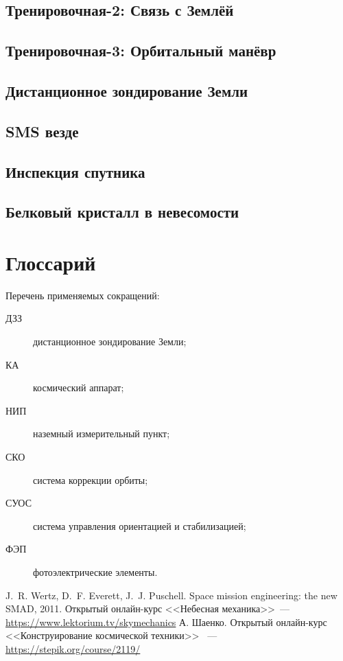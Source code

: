 \documentclass[12pt,a4paper]{article}
\begin{document}
\subsection{Тренировочная-2: Связь с Землёй}
\subsection{Тренировочная-3: Орбитальный манёвр}
\subsection{Дистанционное зондирование Земли}
\subsection{SMS везде}
\subsection{Инспекция спутника}
\subsection{Белковый кристалл в невесомости}

\section*{Глоссарий}

Перечень применяемых сокращений:

\begin{description}
  \item[ДЗЗ] дистанционное зондирование Земли;
  \item[КА] космический аппарат;
  \item[НИП] наземный измерительный пункт;
  \item[СКО] система коррекции орбиты;
  \item[СУОС] система управления ориентацией и стабилизацией;
  \item[ФЭП] фотоэлектрические элементы.
\end{description}

\begin{thebibliography}{2}
 J.~R. Wertz, D.~F. Everett, J.~J. Puschell. Space mission
engineering: the new SMAD, 2011.
 Открытый онлайн-курс <<Небесная механика>>~---
  \url{https://www.lektorium.tv/skymechanics}
 А. Шаенко. Открытый онлайн-курс <<Конструирование космической техники>> ~---
  \url{https://stepik.org/course/2119/}
\end{thebibliography}
\end{document}
